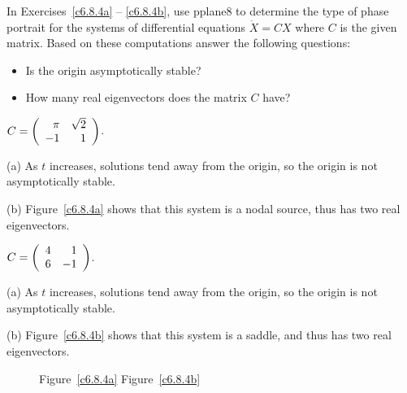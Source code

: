 \documentclass{ximera}
\begin{document}
\noindent In Exercises~\ref{c6.8.4a} -- \ref{c6.8.4b}, use {\sf pplane8} to
determine the type of phase portrait for the systems of differential equations
$\dot{X}=CX$ where $C$ is the given matrix.  Based on these computations
answer the following questions:
\begin{itemize}
\item[(a)]  Is the origin asymptotically stable?
\item[(b)]  How many real eigenvectors does the matrix $C$ have?
\end{itemize}
\begin{exercise} \label{c6.8.4a}
$C=\left(\begin{array}{rr} \pi & \sqrt{2}\\ -1 &1\end{array}\right)$.

\begin{solution}

(a) As $t$ increases, solutions tend away from the origin, so the origin
is not asymptotically stable.

(b) Figure~\ref{c6.8.4a} shows that this system is a nodal source,
thus has two real eigenvectors.

\end{solution}
\end{exercise}
\begin{exercise} \label{c6.8.4b}
$C=\left(\begin{array}{rr} 4 & 1\\ 6 &-1\end{array}\right)$.

\begin{solution}

(a) As $t$ increases, solutions tend away from the origin, so the origin
is not asymptotically stable.

(b) Figure~\ref{c6.8.4b} shows that this system is a saddle, and thus
has two real eigenvectors.

\begin{figure}[htb]
                       \centerline{%
                       }
                \centerline{Figure~\ref{c6.8.4a}\hspace{2.1in}
Figure~\ref{c6.8.4b}}
\end{figure}




\end{solution}
\end{exercise}
\end{document}
